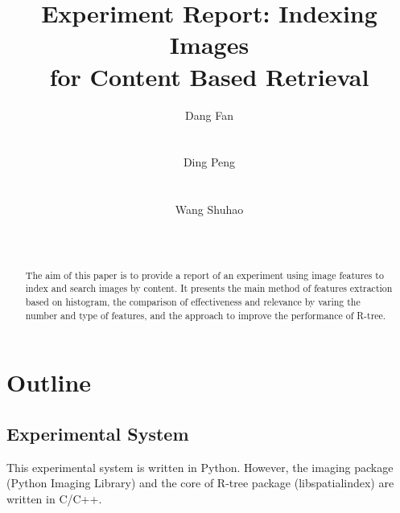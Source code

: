 \documentclass{acm_proc_article-sp}
\begin{document}
\title{Experiment Report: Indexing Images\\
for Content Based Retrieval}

\author{
\alignauthor
Dang Fan\\
       \\
       \\
\alignauthor
Ding Peng\\
       \\
       \\
\alignauthor
Wang Shuhao\\
       \\
       \\
}

\maketitle
\begin{abstract}
The aim of this paper is to provide a report of an experiment using image features to index and search images by content. It presents the main method of features extraction based on histogram, the comparison of effectiveness and relevance by varing the number and type of features, and the approach to improve the performance of R-tree.
\end{abstract}




\section{Outline}
\subsection{Experimental System}
This experimental system is written in Python. However, the imaging package (Python Imaging Library) and the core of R-tree package (libspatialindex) are written in C/C++.
\end{document}
